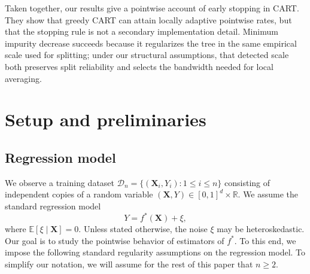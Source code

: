 \documentclass[11pt]{article}
\theoremstyle{plain}
\theoremstyle{definition}
\theoremstyle{remark}
\theoremstyle{plain}
\newcommand{\bx}{\mathbf{x}}
\newcommand{\bX}{\mathbf{X}}
\newcommand{\E}{\mathbb{E}}
\newcommand{\1}{\mathbbm{1}}
\begin{document}
Taken together, our results give a pointwise account of early stopping in CART.
They show that greedy CART can attain locally adaptive pointwise rates, but that the stopping rule is not a secondary implementation detail.
Minimum impurity decrease succeeds because it regularizes the tree in the same empirical scale used for splitting; under our structural assumptions, that detected scale both preserves split reliability and selects the bandwidth needed for local averaging.

\section{Setup and preliminaries}

\subsection{Regression model}
\label{sec:regression-model}

We observe a training dataset $\mathcal D_n=\{(\bX_i,Y_i):1\le i\le n\}$ consisting of independent copies of a random variable $(\bX,Y) \in [0,1]^d\times\mathbb R$. 
We assume the standard regression model
\begin{equation} \label{eq:regression}
Y=f^*(\bX)+\xi,
\end{equation}
where $\E[\xi\mid \bX]=0$. 
Unless stated otherwise, the noise $\xi$ may be heteroskedastic.
Our goal is to study the pointwise behavior of estimators of $f^*$.
To this end, we impose the following standard regularity assumptions on the regression model. To simplify our notation, we will assume for the rest of this paper that $n\geq 2$.




\end{document}
